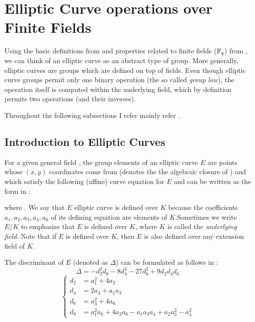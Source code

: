 \section{Elliptic Curve operations over Finite Fields}
\label{sec:ch1.EllipticCurveCryptographicGroups}



Using the basic definitions from  and properties related to finite fields ($\mathbb{F}_q$) from , we can think of an elliptic curve as an abstract type of group.  More generally, elliptic curves are groups which are defined on top of fields. Even though elliptic curve groups permit only one binary operation (the so called \textit{group law}),
the operation itself is computed within the underlying field, which by definition permits two operations (and their inverses). 

Throughout the following subsections I refer mainly refer \cite{theory.pairings.for.beginners, menezes2004ECC}.



\subsection{Introduction to Elliptic Curves }
\label{ssec:ch2.introductiontoellipticcurves}

For a given general field \mathFormulaFieldArbitrary, the group elements of an elliptic curve $E$ are points whose $(x,y)$ coordinates come from \FieldArbitraryClosure (denotes the the algebraic closure of \FieldArbitrary) and which satisfy the following (affine) curve equation for $E$ and can be written as the form in :


\noindent where .  We say that $E$ elliptic curve is defined over $K$ because the coefficients $a_1, a_2, a_3, a_4, a_6$ 
of its defining equation are elements of $K$.Sometimes we write $E/K$ to emphasize
that $E$ is defined over $K$, where $K$ is called the \textit{underlying field}. Note that if
$E$ is defined over $K$, then $E$ is also defined over any extension field of $K$.

The discriminant of $E$ (denoted as  $\Delta$) can be formulated as follows in :
\begin{equation}
	\Delta = -d_2^2 d_8 - 8d_4^3 - 27d_6^2 + 9d_2 d_4 d_6
	\label{eq:ch3.discriminant}
\end{equation}
\begin{equation}
	\left\{
	\begin{aligned}
		d_2 &= a_1^2 + 4a_2 \\
		d_4 &= 2a_4 + a_1 a_3 \\
		d_6 &= a_3^2 + 4a_6 \\
		d_8 &= a_1^2 a_6 + 4a_2 a_6 - a_1 a_3 a_4 + a_2 a_3^2 - a_4^2
	\end{aligned}
	\right.
	\label{eq:ch3.discriminantCoefficients}
\end{equation}

